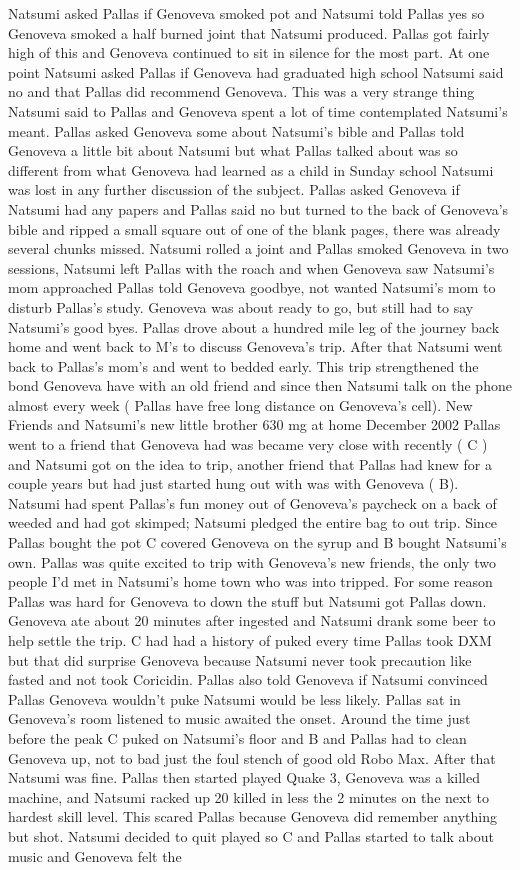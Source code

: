 \documentclass[12pt]{book}
\begin{document}
Natsumi asked Pallas if Genoveva smoked pot and Natsumi told Pallas yes so Genoveva smoked a half burned joint that Natsumi produced. Pallas got fairly high of this and Genoveva continued to sit in silence for the most part. At one point Natsumi asked Pallas if Genoveva had graduated high school Natsumi said no and that Pallas did recommend Genoveva. This was a very strange thing Natsumi said to Pallas and Genoveva spent a lot of time contemplated Natsumi's meant. Pallas asked Genoveva some about Natsumi's bible and Pallas told Genoveva a little bit about Natsumi but what Pallas talked about was so different from what Genoveva had learned as a child in Sunday school Natsumi was lost in any further discussion of the subject. Pallas asked Genoveva if Natsumi had any papers and Pallas said no but turned to the back of Genoveva's bible and ripped a small square out of one of the blank pages, there was already several chunks missed. Natsumi rolled a joint and Pallas smoked Genoveva in two sessions, Natsumi left Pallas with the roach and when Genoveva saw Natsumi's mom approached Pallas told Genoveva goodbye, not wanted Natsumi's mom to disturb Pallas's study. Genoveva was about ready to go, but still had to say Natsumi's good byes. Pallas drove about a hundred mile leg of the journey back home and went back to M's to discuss Genoveva's trip. After that Natsumi went back to Pallas's mom's and went to bedded early. This trip strengthened the bond Genoveva have with an old friend and since then Natsumi talk on the phone almost every week ( Pallas have free long distance on Genoveva's cell).  New Friends and Natsumi's new little brother 630 mg at home December 2002  Pallas went to a friend that Genoveva had was became very close with recently ( C ) and Natsumi got on the idea to trip, another friend that Pallas had knew for a couple years but had just started hung out with was with Genoveva ( B). Natsumi had spent Pallas's fun money out of Genoveva's paycheck on a back of weeded and had got skimped; Natsumi pledged the entire bag to out trip. Since Pallas bought the pot C covered Genoveva on the syrup and B bought Natsumi's own. Pallas was quite excited to trip with Genoveva's new friends, the only two people I'd met in Natsumi's home town who was into tripped. For some reason Pallas was hard for Genoveva to down the stuff but Natsumi got Pallas down. Genoveva ate about 20 minutes after ingested and Natsumi drank some beer to help settle the trip. C had had a history of puked every time Pallas took DXM but that did surprise Genoveva because Natsumi never took precaution like fasted and not took Coricidin. Pallas also told Genoveva if Natsumi convinced Pallas Genoveva wouldn't puke Natsumi would be less likely. Pallas sat in Genoveva's room listened to music awaited the onset. Around the time just before the peak C puked on Natsumi's floor and B and Pallas had to clean Genoveva up, not to bad just the foul stench of good old Robo Max. After that Natsumi was fine. Pallas then started played Quake 3, Genoveva was a killed machine, and Natsumi racked up 20 killed in less the 2 minutes on the next to hardest skill level. This scared Pallas because Genoveva did remember anything but shot. Natsumi decided to quit played so C and Pallas started to talk about music and Genoveva felt the 
\end{document}
